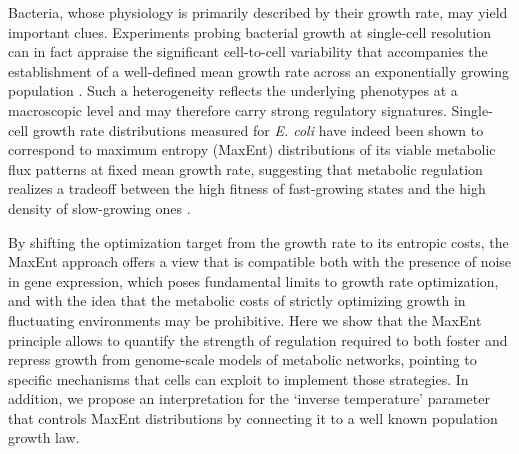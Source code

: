 \documentclass[superscriptaddress,amsmath,amssymb,twocolumn]{revtex4-1}
\begin{document}
Bacteria, whose physiology is primarily described by their growth rate, may yield important clues. Experiments probing bacterial growth at single-cell resolution can in fact appraise the significant cell-to-cell variability that accompanies the establishment of a well-defined mean growth rate across an exponentially growing population \cite{jun,ken,elf}. Such a heterogeneity reflects the underlying phenotypes at a macroscopic level and may therefore carry strong regulatory signatures. Single-cell growth rate distributions measured for {\it E. coli} have indeed been shown to correspond to maximum entropy (MaxEnt) distributions of its viable metabolic flux patterns at fixed mean growth rate, suggesting that metabolic regulation realizes a tradeoff between the high fitness of fast-growing states and the high density of slow-growing ones \cite{physbio}. 

By shifting the optimization target from the growth rate to its entropic costs, the MaxEnt approach offers a view that is compatible both with the presence of noise in gene expression, which poses fundamental limits to growth rate optimization, and with the idea that the metabolic costs of strictly optimizing growth in fluctuating environments may be prohibitive. Here we show that the MaxEnt principle allows to quantify the strength of regulation required to both foster and repress growth from genome-scale models of metabolic networks, pointing to specific mechanisms that cells can exploit to implement those strategies. In addition, we propose an  interpretation for the `inverse temperature' parameter that controls MaxEnt distributions by connecting it to a well known population growth law.
\end{document}
